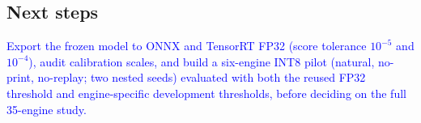 \documentclass[conference]{IEEEtran}
\newcommand{\scope}[1]{\textcolor{blue}{#1}}
\begin{document}
\subsection{Next steps}
\scope{Export the frozen model to ONNX and TensorRT FP32 (score tolerance $10^{-5}$ and $10^{-4}$), audit
calibration scales, and build a six-engine INT8 pilot (natural, no-print, no-replay; two nested seeds) evaluated
with both the reused FP32 threshold and engine-specific development thresholds, before deciding on the full
35-engine study.}

\balance


\end{document}
